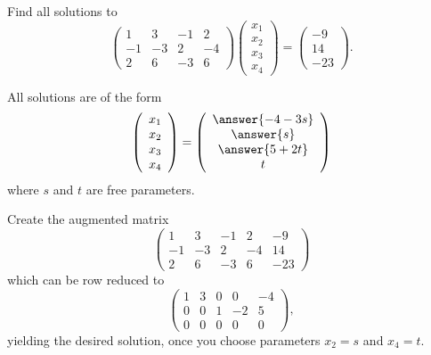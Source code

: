 \documentclass{ximera}
\begin{document}
\problemlabel

\begin{exercise} %
Find all solutions to
\[
\left(\begin{array}{rrrr} 
  1 & 3 & -1 & 2 \\ 
  -1 & -3 & 2 & -4 \\
  2 & 6 & -3 & 6 \end{array} \right)
\left(\begin{array}{c} x_1 \\ x_2 \\ x_3 \\ x_4\end{array}\right) =
\left(\begin{array}{c} -9 \\ 14 \\ -23 \end{array}\right).
\]


\ans All solutions are of the form
\[ \left(\begin{array}{r} x_1 \\ x_2 \\ x_3 \\ x_4\end{array}\right) =
\left(\begin{array}{c} \answer{-4 -3s} \\
\answer{s} \\ \answer{5 +2t} \\ t\end{array}\right)
\]
where $s$ and $t$ are free parameters.

\begin{hint}
Create the augmented matrix
\[ \left(\begin{array}{rrrr|r}
1 & 3 & -1 & 2 & -9 \\
-1 & -3 & 2 & -4 & 14 \\
2 & 6 & -3 & 6 & -23\end{array}\right) \]
which can be row reduced to
\[ \left(\begin{array}{rrrr|r}
1 & 3 & 0 & 0 & -4 \\
0 & 0 & 1 & -2 & 5 \\
0 & 0 & 0 & 0 & 0 \end{array}\right), \]
yielding the desired solution, once you choose parameters $x_2=s$ and $x_4 = t$. 

\end{hint}
\end{exercise}
\end{document}
